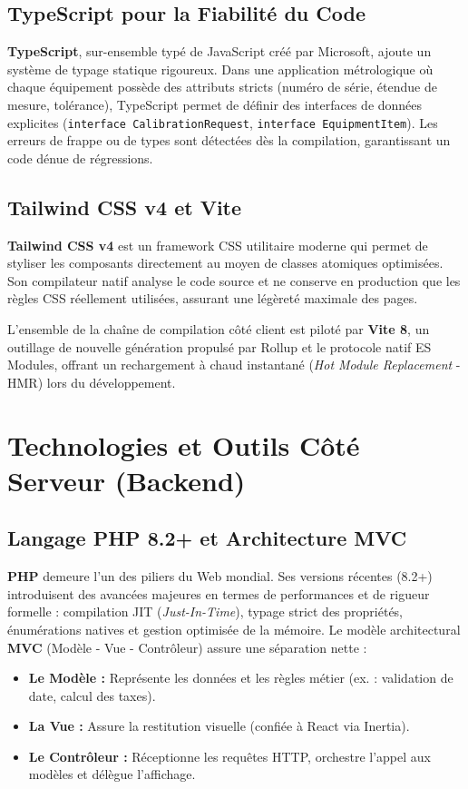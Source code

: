 \documentclass{bts-report}
\begin{document}
\subsection{TypeScript pour la Fiabilit\'e du Code}
\textbf{TypeScript}, sur-ensemble typ\'e de JavaScript cr\'e\'e par Microsoft, ajoute un syst\`eme de typage statique rigoureux. Dans une application m\'etrologique o\`u chaque \'equipement poss\`ede des attributs stricts (num\'ero de s\'erie, \'etendue de mesure, tol\'erance), TypeScript permet de d\'efinir des interfaces de donn\'ees explicites (\texttt{interface CalibrationRequest}, \texttt{interface EquipmentItem}). Les erreurs de frappe ou de types sont d\'etect\'ees d\`es la compilation, garantissant un code d\'enue de r\'egressions.

\subsection{Tailwind CSS v4 et Vite}
\textbf{Tailwind CSS v4} est un framework CSS utilitaire moderne qui permet de styliser les composants directement au moyen de classes atomiques optimis\'ees. Son compilateur natif analyse le code source et ne conserve en production que les r\`egles CSS r\'eellement utilis\'ees, assurant une l\'eg\`eret\'e maximale des pages.

L'ensemble de la cha\^ine de compilation c\^ot\'e client est pilot\'e par \textbf{Vite 8}, un outillage de nouvelle g\'en\'eration propuls\'e par Rollup et le protocole natif ES Modules, offrant un rechargement \`a chaud instantan\'e (\textit{Hot Module Replacement} - HMR) lors du d\'eveloppement.

\section{Technologies et Outils C\^ot\'e Serveur (Backend)}
\subsection{Langage PHP 8.2+ et Architecture MVC}
\textbf{PHP} demeure l'un des piliers du Web mondial. Ses versions r\'ecentes (8.2+) introduisent des avanc\'ees majeures en termes de performances et de rigueur formelle : compilation JIT (\textit{Just-In-Time}), typage strict des propri\'et\'es, \'enum\'erations natives et gestion optimis\'ee de la m\'emoire. Le mod\`ele architectural \textbf{MVC} (Mod\`ele - Vue - Contr\^oleur) assure une s\'eparation nette :
\begin{itemize}
  \item \textbf{Le Mod\`ele :} Repr\'esente les donn\'ees et les r\`egles m\'etier (ex. : validation de date, calcul des taxes).
  \item \textbf{La Vue :} Assure la restitution visuelle (confi\'ee \`a React via Inertia).
  \item \textbf{Le Contr\^oleur :} R\'eceptionne les requ\^etes HTTP, orchestre l'appel aux mod\`eles et d\'el\`egue l'affichage.
\end{itemize}
\end{document}
